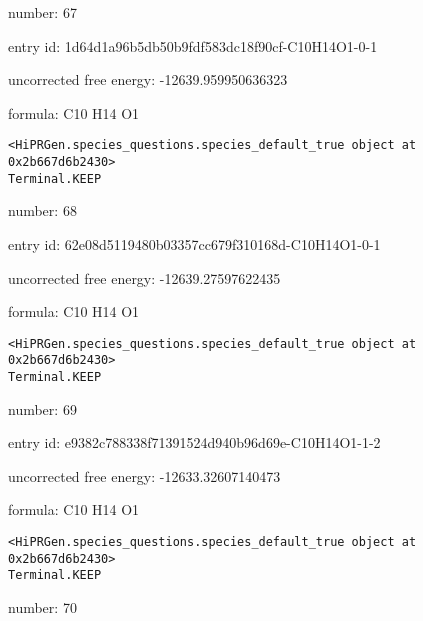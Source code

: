 \documentclass{article}
\begin{document}
number: 67



entry id: 1d64d1a96b5db50b9fdf583dc18f90cf-C10H14O1-0-1



uncorrected free energy: -12639.959950636323



formula: C10 H14 O1


\vspace{1cm}
\begin{verbatim}
<HiPRGen.species_questions.species_default_true object at 0x2b667d6b2430>
Terminal.KEEP
\end{verbatim}


number: 68



entry id: 62e08d5119480b03357cc679f310168d-C10H14O1-0-1



uncorrected free energy: -12639.27597622435



formula: C10 H14 O1


\vspace{1cm}
\begin{verbatim}
<HiPRGen.species_questions.species_default_true object at 0x2b667d6b2430>
Terminal.KEEP
\end{verbatim}


number: 69



entry id: e9382c788338f71391524d940b96d69e-C10H14O1-1-2



uncorrected free energy: -12633.32607140473



formula: C10 H14 O1


\vspace{1cm}
\begin{verbatim}
<HiPRGen.species_questions.species_default_true object at 0x2b667d6b2430>
Terminal.KEEP
\end{verbatim}


number: 70
\end{document}
